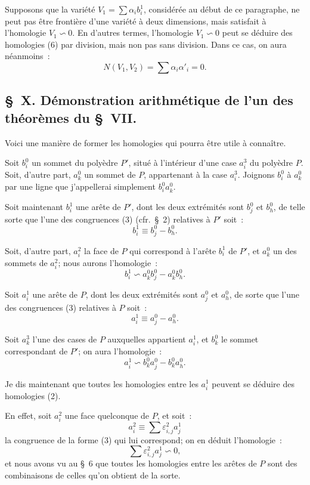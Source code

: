 \documentclass{article}
\begin{document}
Supposons que la variété $V_{1} = \displaystyle\sum \alpha_{i} b^{1}_{i}$, considérée au début de ce paragraphe, ne peut pas être frontière d'une variété à deux dimensions, mais satisfait à l'homologie $V_{1} \backsim 0$. En d'autres termes, l'homologie $V_{1} \backsim 0$ peut se déduire des homologies (6) par division, mais non pas sans division. Dans ce cas, on aura néanmoins~:
\[ N(V_{1}, V_{2}) = \sum \alpha_{i} \alpha'_{i} = 0. \]


\subsection*{\S~X. Démonstration arithmétique de l'un des théorèmes du \S~VII.}

Voici une manière de former les homologies qui pourra être utile à connaître.

Soit $b^{0}_{i}$ un sommet du polyèdre $P'$, situé à l'intérieur d'une case $a^{3}_{i}$ du polyèdre $P$. Soit, d'autre part, $a^{0}_{k}$ un sommet de $P$, appartenant à la case $a^{3}_{i}$. Joignons $b^{0}_{i}$ à $a^{0}_{k}$ par une ligne que j'appellerai simplement $b^{0}_{i} a^{0}_{k}$.

Soit maintenant $b^{1}_{i}$ une arête de $P'$, dont les deux extrémités sont $b^{0}_{j}$ et $b^{0}_{h}$, de telle sorte que l'une des congruences (3) (cfr.\ \S~2) relatives à $P'$ soit~:
\[ b^{1}_{i} \equiv b^{0}_{j} - b^{0}_{h}. \]

Soit, d'autre part, $a^{2}_{i}$ la face de $P$ qui correspond à l'arête $b^{1}_{i}$ de $P'$, et $a^{0}_{k}$ un des sommets de $a^{2}_{i}$; nous aurons l'homologie~:
\[ b^{1}_{i} \backsim a^{0}_{k} b^{0}_{j} - a^{0}_{k} b^{0}_{h}. \tag{1} \]

Soit $a^{1}_{i}$ une arête de $P$, dont les deux extrémités sont $a^{0}_{j}$ et $a^{0}_{h}$, de sorte que l'une des congruences (3) relatives à $P$ soit~:
\[ a^{1}_{i} \equiv a^{0}_{j} - a^{0}_{h}. \]

Soit $a^{3}_{k}$ l'une des cases de $P$ auxquelles appartient $a^{1}_{i}$, et $b^{0}_{k}$ le sommet correspondant de $P'$; on aura l'homologie~:
\[ a^{1}_{i} \backsim b^{0}_{k} a^{0}_{j} - b^{0}_{k} a^{0}_{h}. \tag{2} \]

Je dis maintenant que toutes les homologies entre les $a^{1}_{i}$ peuvent se déduire des homologies (2).

En effet, soit $a^{2}_{i}$ une face quelconque de $P$, et soit~:
\[ a^{2}_{i} \equiv \sum \varepsilon^{2}_{i,j} a^{1}_{j} \]
la congruence de la forme (3) qui lui correspond; on en déduit l'homologie~:
\[ \sum \varepsilon^{2}_{i,j} a^{1}_{j} \backsim 0, \tag{3} \]
et nous avons vu au \S~6 que toutes les homologies entre les arêtes de $P$ sont des combinaisons de celles qu'on obtient de la sorte.
\end{document}
